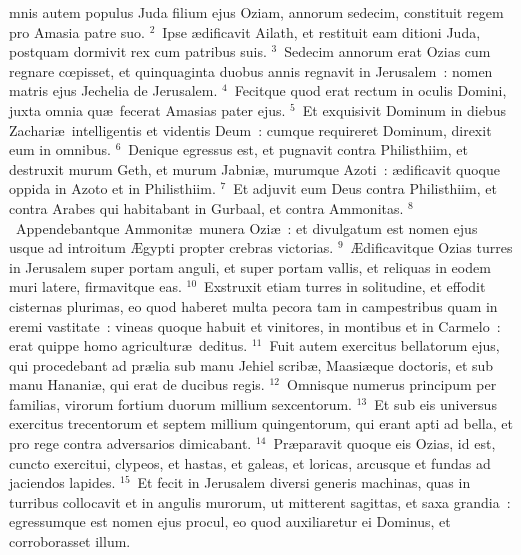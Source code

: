 \bchapter
{}mnis autem populus Juda filium ejus Oziam, annorum sedecim, constituit regem pro Amasia patre suo.
${}^{2}$~Ipse \ae dificavit Ailath, et restituit eam ditioni Juda, postquam dormivit rex cum patribus suis.
${}^{3}$~Sedecim annorum erat Ozias cum regnare cœpisset, et quinquaginta duobus annis regnavit in Jerusalem~: nomen matris ejus Jechelia de Jerusalem.
${}^{4}$~Fecitque quod erat rectum in oculis Domini, juxta omnia qu\ae\ fecerat Amasias pater ejus.
${}^{5}$~Et exquisivit Dominum in diebus Zachari\ae\ intelligentis et videntis Deum~: cumque requireret Dominum, direxit eum in omnibus.
${}^{6}$~Denique egressus est, et pugnavit contra Philisthiim, et destruxit murum Geth, et murum Jabni\ae , murumque Azoti~: \ae dificavit quoque oppida in Azoto et in Philisthiim.
${}^{7}$~Et adjuvit eum Deus contra Philisthiim, et contra Arabes qui habitabant in Gurbaal, et contra Ammonitas.
${}^{8}$~Appendebantque Ammonit\ae\ munera Ozi\ae~: et divulgatum est nomen ejus usque ad introitum \AE gypti propter crebras victorias.
${}^{9}$~\AE dificavitque Ozias turres in Jerusalem super portam anguli, et super portam vallis, et reliquas in eodem muri latere, firmavitque eas.
${}^{10}$~Exstruxit etiam turres in solitudine, et effodit cisternas plurimas, eo quod haberet multa pecora tam in campestribus quam in eremi vastitate~: vineas quoque habuit et vinitores, in montibus et in Carmelo~: erat quippe homo agricultur\ae\ deditus.
${}^{11}$~Fuit autem exercitus bellatorum ejus, qui procedebant ad pr\ae lia sub manu Jehiel scrib\ae , Maasi\ae que doctoris, et sub manu Hanani\ae , qui erat de ducibus regis.
${}^{12}$~Omnisque numerus principum per familias, virorum fortium duorum millium sexcentorum.
${}^{13}$~Et sub eis universus exercitus trecentorum et septem millium quingentorum, qui erant apti ad bella, et pro rege contra adversarios dimicabant.
${}^{14}$~Pr\ae paravit quoque eis Ozias, id est, cuncto exercitui, clypeos, et hastas, et galeas, et loricas, arcusque et fundas ad jaciendos lapides.
${}^{15}$~Et fecit in Jerusalem diversi generis machinas, quas in turribus collocavit et in angulis murorum, ut mitterent sagittas, et saxa grandia~: egressumque est nomen ejus procul, eo quod auxiliaretur ei Dominus, et corroborasset illum.


